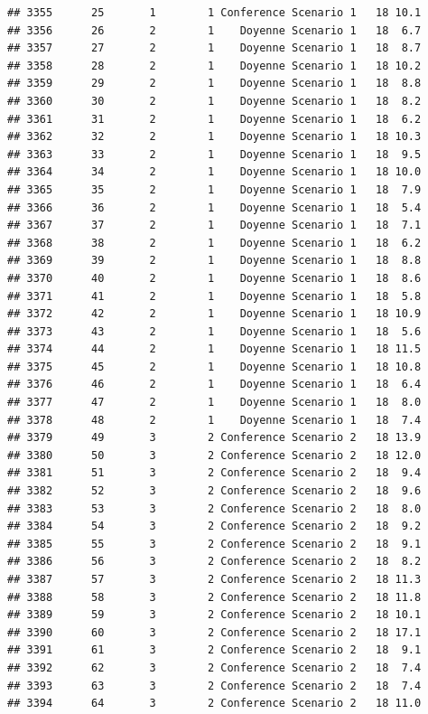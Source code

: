 \documentclass[
]{article}
\begin{document}
\begin{verbatim}
## 3355      25       1        1 Conference Scenario 1   18 10.1
## 3356      26       2        1    Doyenne Scenario 1   18  6.7
## 3357      27       2        1    Doyenne Scenario 1   18  8.7
## 3358      28       2        1    Doyenne Scenario 1   18 10.2
## 3359      29       2        1    Doyenne Scenario 1   18  8.8
## 3360      30       2        1    Doyenne Scenario 1   18  8.2
## 3361      31       2        1    Doyenne Scenario 1   18  6.2
## 3362      32       2        1    Doyenne Scenario 1   18 10.3
## 3363      33       2        1    Doyenne Scenario 1   18  9.5
## 3364      34       2        1    Doyenne Scenario 1   18 10.0
## 3365      35       2        1    Doyenne Scenario 1   18  7.9
## 3366      36       2        1    Doyenne Scenario 1   18  5.4
## 3367      37       2        1    Doyenne Scenario 1   18  7.1
## 3368      38       2        1    Doyenne Scenario 1   18  6.2
## 3369      39       2        1    Doyenne Scenario 1   18  8.8
## 3370      40       2        1    Doyenne Scenario 1   18  8.6
## 3371      41       2        1    Doyenne Scenario 1   18  5.8
## 3372      42       2        1    Doyenne Scenario 1   18 10.9
## 3373      43       2        1    Doyenne Scenario 1   18  5.6
## 3374      44       2        1    Doyenne Scenario 1   18 11.5
## 3375      45       2        1    Doyenne Scenario 1   18 10.8
## 3376      46       2        1    Doyenne Scenario 1   18  6.4
## 3377      47       2        1    Doyenne Scenario 1   18  8.0
## 3378      48       2        1    Doyenne Scenario 1   18  7.4
## 3379      49       3        2 Conference Scenario 2   18 13.9
## 3380      50       3        2 Conference Scenario 2   18 12.0
## 3381      51       3        2 Conference Scenario 2   18  9.4
## 3382      52       3        2 Conference Scenario 2   18  9.6
## 3383      53       3        2 Conference Scenario 2   18  8.0
## 3384      54       3        2 Conference Scenario 2   18  9.2
## 3385      55       3        2 Conference Scenario 2   18  9.1
## 3386      56       3        2 Conference Scenario 2   18  8.2
## 3387      57       3        2 Conference Scenario 2   18 11.3
## 3388      58       3        2 Conference Scenario 2   18 11.8
## 3389      59       3        2 Conference Scenario 2   18 10.1
## 3390      60       3        2 Conference Scenario 2   18 17.1
## 3391      61       3        2 Conference Scenario 2   18  9.1
## 3392      62       3        2 Conference Scenario 2   18  7.4
## 3393      63       3        2 Conference Scenario 2   18  7.4
## 3394      64       3        2 Conference Scenario 2   18 11.0

\end{verbatim}
\end{document}
